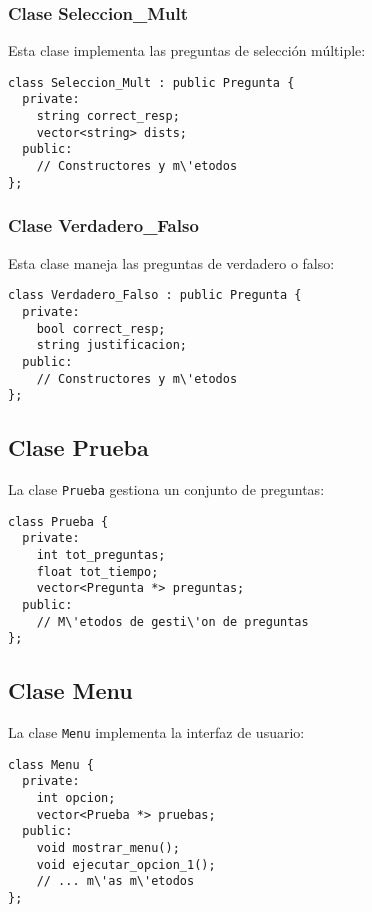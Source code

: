 \documentclass[12pt]{article}
\begin{document}
\subsubsection{Clase Seleccion\_Mult}
Esta clase implementa las preguntas de selecci\'on m\'ultiple:

\begin{lstlisting}[style=customc]
class Seleccion_Mult : public Pregunta {  
  private:
    string correct_resp;
    vector<string> dists;
  public:
    // Constructores y m\'etodos
};
\end{lstlisting}

\subsubsection{Clase Verdadero\_Falso}
Esta clase maneja las preguntas de verdadero o falso:

\begin{lstlisting}[style=customc]
class Verdadero_Falso : public Pregunta {
  private:
    bool correct_resp;
    string justificacion;
  public:
    // Constructores y m\'etodos
};
\end{lstlisting}

\subsection{Clase Prueba}
La clase \texttt{Prueba} gestiona un conjunto de preguntas:

\begin{lstlisting}[style=customc]
class Prueba {
  private:
    int tot_preguntas;
    float tot_tiempo;
    vector<Pregunta *> preguntas;
  public:
    // M\'etodos de gesti\'on de preguntas
};
\end{lstlisting}

\subsection{Clase Menu}
La clase \texttt{Menu} implementa la interfaz de usuario:

\begin{lstlisting}[style=customc]
class Menu {
  private:
    int opcion;
    vector<Prueba *> pruebas;
  public:
    void mostrar_menu();
    void ejecutar_opcion_1();
    // ... m\'as m\'etodos
};
\end{lstlisting}
\end{document}

